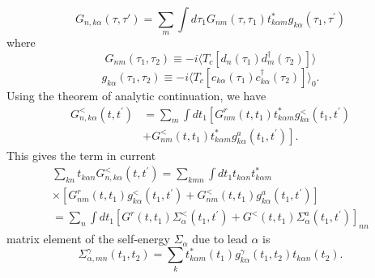 \documentclass[11pt,a4paper]{article}
\begin{document}
\begin{equation}
G_{n,k\alpha}(\tau,\tau')=\sum_{m} \int d \tau_{1} G_{n m}\left(\tau, \tau_{1}\right) t_{k \alpha m}^{*} g_{k \alpha}\left(\tau_{1}, \tau^{\prime}\right)
\end{equation}
where
\begin{equation}
G_{n m}\left(\tau_{1}, \tau_{2}\right) \equiv-i \langle T_{c} \left[d_{n} \left(\tau_{1}\right) d_{m}^{\dagger}\left(\tau_{2}\right)\right]\rangle
\end{equation}
\begin{equation}
g_{k \alpha}\left(\tau_{1}, \tau_{2}\right) \equiv-i \langle T_{c}\left[c_{k \alpha}\left(\tau_{1}\right) c_{k \alpha}^{\dagger}\left(\tau_{2}\right)\right] \rangle_{0}.
\end{equation}
Using the theorem of analytic continuation, we have
\begin{equation}
\begin{aligned}
G_{n, k \alpha}^{<}\left(t, t^{\prime}\right) &=\sum_{m} \int d t_{1}\left[G_{n m}^{r}\left(t, t_{1}\right) t_{k \alpha m}^{*} g_{k \alpha}^{<}\left(t_{1}, t^{\prime}\right)\right.\\
&\left.+G_{n m}^{<}\left(t, t_{1}\right) t_{k \alpha m}^{*} g_{k \alpha}^{a}\left(t_{1}, t^{\prime}\right)\right].
\end{aligned}
\end{equation}
This gives the term in current
\begin{equation}
\begin{array}{l}
\sum_{kn} t_{k \alpha n} G_{n, k \alpha}^{<}\left(t, t^{\prime}\right)=\sum_{k mn} \int d t_{1} t_{k \alpha n} t_{k \alpha m}^{*} \\
\times\left[G_{n m}^{r}\left(t, t_{1}\right) g_{k \alpha}^{<}\left(t_{1}, t^{\prime}\right)+G_{n m}^{<}\left(t, t_{1}\right) g_{k \alpha}^{a}\left(t_{1}, t^{\prime}\right)\right] \\
=\sum_{n}\int d t_{1}\left[G^{r}\left(t, t_{1}\right) \Sigma_{\alpha}^{<}\left(t_{1}, t^{\prime}\right)+G^{<}\left(t, t_{1}\right) \Sigma_{\alpha}^{a}\left(t_{1}, t^{\prime}\right)\right]_{n n}
\end{array}
\label{eq:term1}
\end{equation}
matrix element of the self-energy $\Sigma_{\alpha}$ due to lead $\alpha$ is
\begin{equation}
\Sigma_{\alpha,mn}^{\gamma}(t_{1}, t_{2}) = \sum_{k} t_{k\alpha m}^{*}(t_{1}) g_{k\alpha}^{\gamma}(t_{1}, t_{2}) t_{k\alpha n}(t_{2}).
\end{equation}
\end{document}
